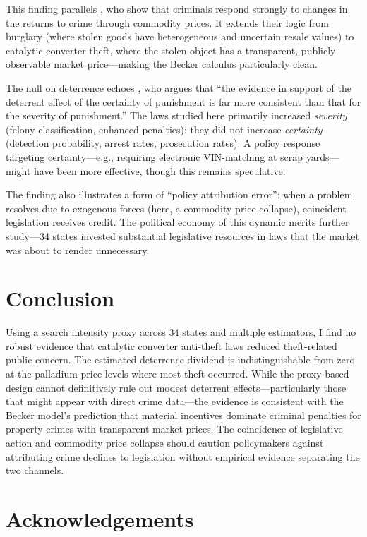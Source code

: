 \documentclass[12pt]{article}
\begin{document}
This finding parallels \citet{draca2019changing}, who show that criminals respond strongly to changes in the returns to crime through commodity prices. It extends their logic from burglary (where stolen goods have heterogeneous and uncertain resale values) to catalytic converter theft, where the stolen object has a transparent, publicly observable market price---making the Becker calculus particularly clean.

The null on deterrence echoes \citet{nagin2013deterrence}, who argues that ``the evidence in support of the deterrent effect of the certainty of punishment is far more consistent than that for the severity of punishment.'' The laws studied here primarily increased \textit{severity} (felony classification, enhanced penalties); they did not increase \textit{certainty} (detection probability, arrest rates, prosecution rates). A policy response targeting certainty---e.g., requiring electronic VIN-matching at scrap yards---might have been more effective, though this remains speculative.

The finding also illustrates a form of ``policy attribution error'': when a problem resolves due to exogenous forces (here, a commodity price collapse), coincident legislation receives credit. The political economy of this dynamic merits further study---34 states invested substantial legislative resources in laws that the market was about to render unnecessary.

\section{Conclusion}

Using a search intensity proxy across 34 states and multiple estimators, I find no robust evidence that catalytic converter anti-theft laws reduced theft-related public concern. The estimated deterrence dividend is indistinguishable from zero at the palladium price levels where most theft occurred. While the proxy-based design cannot definitively rule out modest deterrent effects---particularly those that might appear with direct crime data---the evidence is consistent with the Becker model's prediction that material incentives dominate criminal penalties for property crimes with transparent market prices. The coincidence of legislative action and commodity price collapse should caution policymakers against attributing crime declines to legislation without empirical evidence separating the two channels.

\section*{Acknowledgements}
\end{document}
